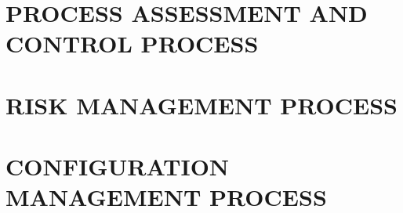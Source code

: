 \documentclass[11pt, twoside, a4paper]{book}
\begin{document}
        \chapter{PROCESS ASSESSMENT AND CONTROL PROCESS}
                    
        \chapter{RISK MANAGEMENT PROCESS}
        
        \chapter{CONFIGURATION MANAGEMENT PROCESS}
    
    
\end{document}
